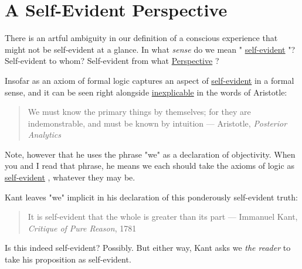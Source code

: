 \documentclass[runningheads]{llncs}
\newcommand{\link}[2]{%
\href{#1}{\textcolor{wikiblue}{#2}\xspace}%
}
\newcommand{\repo}[2]{%
\link{https://github.com/DNA-Platform/inexplicable-phenomena/blob/main/#1}{#2}\xspace%
}
\newcommand{\inexplicable}[0]{%
\repo{research/consciousness/a-novel-perspective-on-vision.md}{inexplicable}%
}
\newcommand{\selfEvident}[0]{%
\repo{research/consciousness/a-novel-perspective-on-vision.md}{self-evident}%
}
\newcommand{\Perspective}[0]{%
\repo{research/consciousness/a-novel-perspective-on-vision.md}{Perspective}%
}
\begin{document}
\section{A Self-Evident Perspective}

There is an artful ambiguity in our definition of a conscious experience that might not be self-evident at a glance. In what \emph{sense} do we mean "\selfEvident"? Self-evident to whom? Self-evident from what \Perspective?

Insofar as an axiom of formal logic captures an aspect of \selfEvident in a formal sense, and it can be seen right alongside \inexplicable in the words of Aristotle:

\begin{quote}
We must know the primary things by themselves; for they are indemonstrable, and must be known by intuition --- Aristotle, \emph{Posterior Analytics} \cite{Aristotle350BC}
\end{quote}

Note, however that he uses the phrase "we" as a declaration of objectivity. When you and I read that phrase, he means we each should take the axioms of logic as \selfEvident, whatever they may be. 

Kant leaves "we" implicit in his declaration of this ponderously self-evident truth:

\begin{quote}
It is self-evident that the whole is greater than its part --- Immanuel Kant, \emph{Critique of Pure Reason}, 1781
\end{quote}

Is this indeed self-evident? Possibly. But either way, Kant asks we \emph{the reader} to take his proposition as self-evident.
\end{document}

